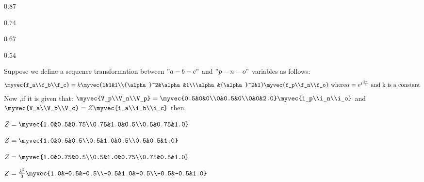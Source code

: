 \begin{enumerate}
  \begin{multicols}{4}
        \item 0.87
        \item 0.74
        \item 0.67
        \item 0.54
    \end{multicols}
\end{enumerate}
\bigskip
\item Suppose we define a sequence transformation between $"a-b-c"$ and $"p-n-o"$ variables as follows:
\begin{align*}
    \myvec{f_a\\f_b\\f_c}=k\myvec{1&1&1\\{\alpha}^2&\alpha&1\\\alpha&{\alpha}^2&1}\myvec{f_p\\f_n\\f_o}\text{ where} \alpha=e^{j\frac{2\pi}{3}} \text{ and k is a constant}
\end{align*}
Now ,if it is given that: $\myvec{V_p\\V_n\\V_p}=\myvec{0.5&0&0\\0&0.5&0\\0&0&2.0}\myvec{i_p\\i_n\\i_o}$ and $\myvec{V_a\\V_b\\V_c}=Z\myvec{i_a\\i_b\\i_c}$ then, 
\begin{enumerate}
    \begin{multicols}{2}
        \item $Z=\myvec{1.0&0.5&0.75\\0.75&1.0&0.5\\0.5&0.75&1.0}$
        \columnbreak
        \item $Z=\myvec{1.0&0.5&0.5\\0.5&1.0&0.5\\0.5&0.5&1.0}$
        \end{multicols}
        \begin{multicols}{2}
        \item $Z=\myvec{1.0&0.75&0.5\\0.5&1.0&0.75\\0.75&0.5&1.0}$
        \item $Z=\frac{k^2}{3}\myvec{1.0&-0.5&-0.5\\-0.5&1.0&-0.5\\-0.5&-0.5&1.0}$
    \end{multicols}
\end{enumerate}
